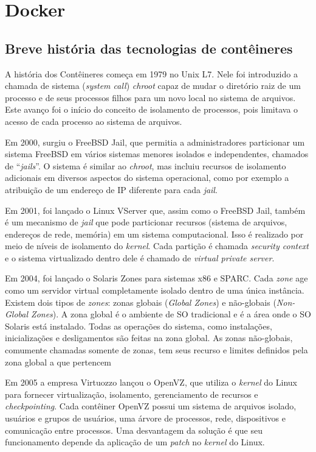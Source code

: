 	\section{Docker}
	\subsection{Breve história das tecnologias de contêineres}
	A história dos Contêineres começa em 1979 no Unix L7. Nele foi introduzido a chamada de sistema (\textit{system call}) \textit{chroot} capaz de mudar o diretório raiz de um processo e de seus processos filhos para um novo local no sistema de arquivos. Este avanço foi o início do conceito de isolamento de processos, pois limitava o acesso de cada processo ao sistema de arquivos. 

	Em 2000, surgiu o FreeBSD Jail, que permitia a administradores particionar um sistema FreeBSD em vários sistemas menores isolados e independentes, chamados de “\textit{jails}”. O sistema é similar ao \textit{chroot}, mas incluiu recursos de isolamento adicionais em diversos aspectos do sistema operacional, como por exemplo a atribuição de um endereço de IP diferente para cada \textit{jail}. \cite{abriefhistoryofcontainers}

	Em 2001, foi lançado o Linux VServer que, assim como o FreeBSD Jail, também é um mecanismo de \textit{jail} que pode particionar recursos (sistema de arquivos, endereços de rede, memória) em um sistema computacional. Isso é realizado por meio de níveis de isolamento do \textit{kernel}. Cada partição é chamada \textit{security context} e o sistema virtualizado dentro dele é chamado de \textit{virtual private server}. \cite{linuxvserver}

	Em 2004, foi lançado o Solaris Zones para sistemas x86 e SPARC. Cada \textit{zone} age como um servidor virtual completamente isolado dentro de uma única instância. Existem dois tipos de \textit{zones}: zonas globais (\textit{Global Zones}) e não-globais (\textit{Non-Global Zones}). A zona global é o ambiente de SO tradicional e é a área onde o SO Solaris está instalado. Todas as operações do sistema, como instalações, inicializações e desligamentos são feitas na zona global. As zonas não-globais, comumente chamadas somente de zonas, tem seus recurso e limites definidos pela zona global a que pertencem  \cite{introductiontosolariszone}

	Em 2005 a empresa Virtuozzo lançou o OpenVZ, que utiliza o \textit{kernel} do Linux para fornecer virtualização, isolamento, gerenciamento de recursos e \textit{checkpointing}. Cada contêiner OpenVZ possui um sistema de arquivos isolado, usuários e grupos de usuários, uma árvore de processos, rede, dispositivos e comunicação entre processos. Uma desvantagem da solução é que seu funcionamento depende da aplicação de um \textit{patch} no \textit{kernel} do Linux. \cite{openvz}

